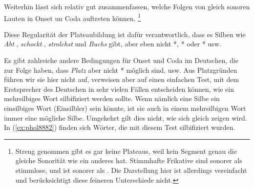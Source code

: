 Weiterhin lässt sich relativ gut zusammenfassen, welche Folgen von gleich sonoren Lauten in Onset un Coda auftreten können.%
\footnote{Streng genommen gibt es gar keine Plateaus, weil kein Segment genau die gleiche Sonorität wie ein anderes hat.
Stimmhafte Frikative sind \zB sonorer als stimmlose, und \textipa{[k]} ist sonorer als \textipa{[t]}.
Die Darstellung hier ist allerdings vereinfacht und berücksichtigt diese feineren Unterschiede nicht.}


Diese Regularität der Plateaubildung ist dafür verantwortlich, dass es Silben wie \textit{Abt} \textipa{[Papt]}, \textit{schockt} \textipa{[SOkt]}, \textit{strolchst} \textipa{[StrOl\c{c}st]} und \textit{Buchs} \textipa{[bu:Xs]} gibt, aber eben nicht *\textipa{[Patp]}, *\textipa{[tkant@]} oder *\textipa{[nOXf]} usw.

Es gibt zahlreiche andere Bedingungen für Onset und Coda im Deutschen, die zur Folge haben, dass \zB \textit{Platz} \textipa{[pla\t{ts}]} aber nicht *\textipa{[tla\t{ts}]} möglich sind, usw.
Aus Platzgründen führen wir sie hier nicht auf, verweisen aber auf einen einfachen Test, mit dem Erstsprecher des Deutschen in sehr vielen Fällen entscheiden können, wie ein mehrsilbiges Wort silbifiziert werden sollte.
Wenn nämlich eine Silbe ein einsilbiges Wort (Einsilbler) sein könnte, ist sie auch in einem mehrsilbigen Wort immer eine mögliche Silbe.
Umgekehrt gilt dies nicht, wie sich gleich zeigen wird.
In (\ref{ex:phol8882}) finden sich Wörter, die mit diesem Test silbifiziert wurden.

\begin{exe}
  \ex\label{ex:phol8882}
  \begin{xlist}
  \end{xlist}
\end{exe}


